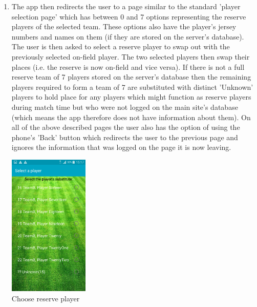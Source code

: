 \documentclass[hidelinks,a4paper,12pt]{article}
\begin{document}
\begin{enumerate}
\begin{center}
  				 \caption{Choose substitute}
			\end{center}
			\item The app then redirects the user to a page similar to the standard 'player selection page' which has between 0 and 7 options representing the reserve players of the selected team. These options also have the player's jersey numbers and names on them (if they are stored on the server's database). The user is then asked to select a reserve player to swap out with the previously selected on-field player. The two selected players then swap their places (i.e. the reserve is now on-field and vice versa). If there is not a full reserve team of 7 players stored on the server's database then the remaining players required to form a team of 7 are substituted with distinct 'Unknown' players to hold place for any players which might function as reserve players during match time but who were not logged on the main site's database (which means the app therefore does not have information about them).
	On all of the above described pages the user also has the option of using the phone's  'Back' button which redirects the user to the previous page and ignores the information that was logged on the page it is now leaving.
		\begin{center}
  				 \includegraphics[width=0.3\textwidth] {./images/choose_substitute_off_field.png}\\[0.4cm]
  				  \caption{Choose reserve player}
			\end{center}
		\end{enumerate}
\end{document}
